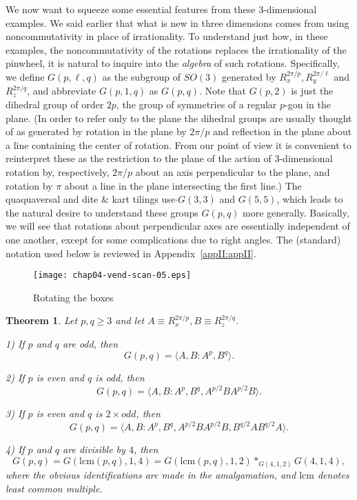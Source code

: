 \documentclass[reqno]{stml-l}
\theoremstyle{plain}
\newtheorem{theorem}{Theorem}[chapter]
\theoremstyle{definition}
\numberwithin{equation}{chapter}
\begin{document}
We now want to squeeze some essential features from these 3-dimensional examples. We said earlier that what is new in three dimensions comes from using noncommutativity in place of irrationality. To understand just how, in these examples, the noncommutativity of the rotations replaces the irrationality of the pinwheel, it is natural to inquire into the \emph{algebra} of such rotations. Specifically, we define $G(p, \ell, q)$ as the subgroup of $SO(3)$ generated by $R_{x}^{2\pi/p},R_{y}^{2\pi/\ell}$ and $R_{z}^{2\pi/q}$, and abbreviate $G(p, 1, q)$ as $G(p, q)$. Note that $G(p, 2)$ is just the dihedral group of order $2p$, the group of symmetries of a regular $p$-gon in the plane. (In order to refer only to the plane the dihedral groups are usually thought of as generated by rotation in the plane by $2\pi/p$ and reflection in the plane about a line containing the center of rotation. From our point of view it is convenient to reinterpret these as the restriction to the plane of the action of 3-dimensional rotation by, respectively, $2\pi/p$ about an axis perpendicular to the plane, and rotation by $\pi$ about a line in the plane intersecting the first line.) The quaquaversal and dite \& kart tilings use$\cdot G(3,3)$ and $G(5,5)$, which leads to the natural desire to understand these groups $G(p, q)$ more generally. Basically, we will see that rotations about perpendicular axes are essentially independent of one another, except for some complications due to right angles. The (standard) notation used below is reviewed in Appendix~\ref{appII:appII}.
\begin{figure}[!h]
\texttt{[image: chap04-vend-scan-05.eps]}
\caption{Rotating the boxes}\label{ch04:fig34}
\end{figure}

\begin{theorem}\label{ch04:thm4.7}
Let $p,q\geq 3$ and let $A\equiv R_{x}^{2\pi/p},B\equiv R_{z}^{2\pi/q}$.

1) If $p$ and $q$ are odd, then
\begin{equation*}
G(p, q)=\langle A,B:A^{p}, B^{q}\rangle.
\end{equation*}

2) If $p$ is even and $q$ is odd, then
\begin{equation*}
G(p, q)=\langle A,B:A^{p},B^{q}, A^{p/2}BA^{p/2}B\rangle.
\end{equation*}

3) If $p$ is even and $q$ is $2\times odd$, then
\begin{equation*}
G(p, q)=\langle A,B:A^{p},B^{q},A^{p/2}BA^{p/2}B, B^{q/2}AB^{q/2}A\rangle.
\end{equation*}

4) If $p$ and $q$ are divisible by $4$, then
\begin{equation*}
G(p, q)=G(\mathrm{lcm}(p, q), 1,4)=G(\mathrm{lcm}(p, q), 1,2)\ast_{G(4,1,2)}G(4,1,4),
\end{equation*}
where the obvious identifications are made in the amalgamation, and $\mathrm{lcm}$
denotes least common multiple.
\end{theorem}
\end{document}
